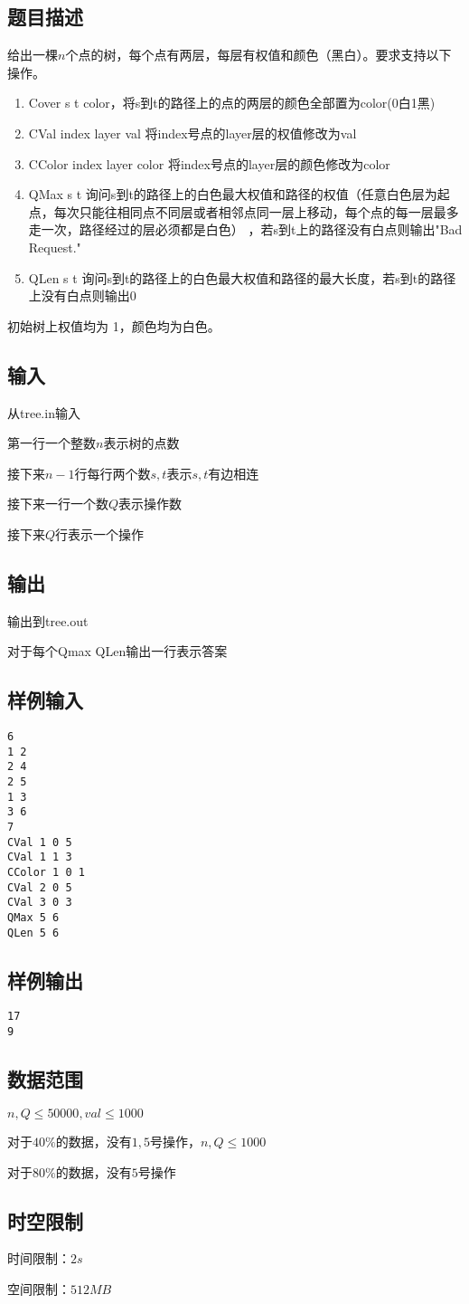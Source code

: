 \documentclass{ctexart}
\begin{document}
\subsection{题目描述}
给出一棵$n$个点的树，每个点有两层，每层有权值和颜色（黑白）。要求支持以下操作。 
\begin{enumerate}
\item Cover s t color，将s到t的路径上的点的两层的颜色全部置为color(0白1黑)
\item CVal index layer val 将index号点的layer层的权值修改为val
\item CColor index layer color 将index号点的layer层的颜色修改为color
\item QMax s t 询问s到t的路径上的白色最大权值和路径的权值（任意白色层为起点，每次只能往相同点不同层或者相邻点同一层上移动，每个点的每一层最多走一次，路径经过的层必须都是白色） ，若s到t上的路径没有白点则输出"Bad Request."
\item QLen s t 询问s到t的路径上的白色最大权值和路径的最大长度，若s到t的路径上没有白点则输出0
\end{enumerate}

初始树上权值均为 1，颜色均为白色。
\subsection{输入}
从tree.in输入

第一行一个整数$n$表示树的点数

接下来$n-1$行每行两个数$s,t$表示$s,t$有边相连

接下来一行一个数$Q$表示操作数

接下来$Q$行表示一个操作
\subsection{输出}
输出到tree.out

对于每个Qmax QLen输出一行表示答案
\subsection{样例输入}
\begin{verbatim}
6
1 2
2 4
2 5
1 3
3 6
7
CVal 1 0 5
CVal 1 1 3
CColor 1 0 1
CVal 2 0 5
CVal 3 0 3
QMax 5 6
QLen 5 6
\end{verbatim}
\subsection{样例输出}
\begin{verbatim}
17
9
\end{verbatim}
\subsection{数据范围}
$n,Q \le 50000,val \le 1000$

对于$40\%$的数据，没有$1,5$号操作，$n,Q \le 1000$

对于$80\%$的数据，没有$5$号操作
\subsection{时空限制}
时间限制：$2s$

空间限制：$512MB$
\end{document}
